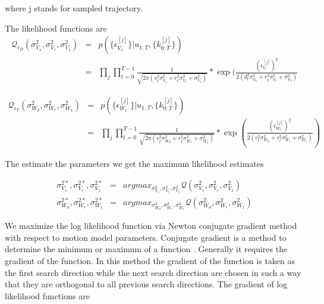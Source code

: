 \documentclass[12pt]{dalcsthesis}
\begin{document}
where j stands for sampled trajectory.

The likelihood functions are 
\begin{eqnarray}
\mathcal{Q}_{\epsilon_{D}}(\sigma_{V_{v}}^{2},\sigma_{V_{r}}^{2},\sigma_{V_{1}}^{2}) & = & p(\{\epsilon_{V_{v}}^{[j]}\}|u_{1:T},\{k_{0:T}^{[j]}\})\\
 & = & \prod_{j}\prod_{t=0}^{T-1}\frac{1}{\sqrt{2\pi(v_{t}^{2}\sigma_{V_{v}}^{2}+r_{t}^{2}\sigma_{V_{r}}^{2}+\sigma_{V_{1}}^{2})}}*\exp(\frac{(\epsilon_{V_{t}}^{[j]})^{2}}{2(d_{t}^{2}\sigma_{V_{v}}^{2}+r_{t}^{2}\sigma_{V_{r}}^{2}+\sigma_{V_{1}}^{2})}
\end{eqnarray}



\begin{eqnarray*}
\mathcal{Q}_{\epsilon_{T}}(\sigma_{W_{d}}^{2},\sigma_{W_{r}}^{2},\sigma_{W_{1}}^{2}) & = & p(\{\epsilon_{W_{t}}^{[j]}\}|u_{1:T},\{k_{0:T}^{[j]}\})\\
 & = & \prod_{j}\prod_{t=0}^{T-1}\frac{1}{\sqrt{2\pi(v_{t}^{2}\sigma_{W_{d}}^{2}+r_{t}^{2}\sigma_{W_{r}}^{2}+\sigma_{W_{1}}^{2})}}*\exp(\frac{(\epsilon_{W_{t}}^{[j]})^{2}}{2(v_{t}^{2}\sigma_{W_{d}}^{2}+r_{t}^{2}\sigma_{W_{r}}^{2}+\sigma_{W_{1}}^{2})})
\end{eqnarray*}


The estimate the parameters we get the maximum likelihood estimates 

\begin{eqnarray}
\sigma_{V_{v}}^{2*},\sigma_{V_{r}}^{2*},\sigma_{V_{1}}^{2*} & = & argmax_{\sigma_{V_{v}}^{2},\sigma_{V_{r}}^{2},\sigma_{V_{1}}^{2}}\mathcal{Q}(\sigma_{V_{v}}^{2},\sigma_{V_{r}}^{2},\sigma_{V_{1}}^{2})\\
\sigma_{W_{d}}^{2*},\sigma_{W_{r}}^{2*},\sigma_{W_{1}}^{2*} & = & argmax_{\sigma_{W_{d}}^{2},\sigma_{W_{r}}^{2},\sigma_{W_{1}}^{2}}\mathcal{Q}(\sigma_{W_{d}}^{2},\sigma_{W_{r}}^{2},\sigma_{W_{1}}^{2})
\end{eqnarray}

We maximize the log likelihood function via Newton conjugate gradient method with respect to motion model parameters. Conjugate gradient is a method to determine the minimum or maximum of a function \cite{shewchuk1994introduction}. Generally it requires the gradient of the function. In this method the gradient of the function is taken as the first search direction while the next search direction are chosen in such a way that they are orthogonal to all previous search directions. The gradient of log likelihood functions are 
\end{document}
